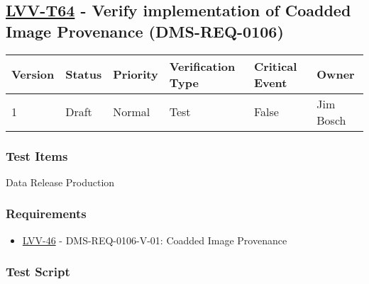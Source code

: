 \hypertarget{lvv-t64---verify-implementation-of-coadded-image-provenance-dms-req-0106}{%
\subsection{\texorpdfstring{\href{https://jira.lsstcorp.org/secure/Tests.jspa\#/testCase/LVV-T64}{LVV-T64}
- Verify implementation of Coadded Image Provenance
(DMS-REQ-0106)}{LVV-T64 - Verify implementation of Coadded Image Provenance (DMS-REQ-0106)}}\label{lvv-t64---verify-implementation-of-coadded-image-provenance-dms-req-0106}}

\begin{longtable}[]{@{}llllll@{}}
\toprule
Version & Status & Priority & Verification Type & Critical Event &
Owner\tabularnewline
\midrule
\endhead
1 & Draft & Normal & Test & False & Jim Bosch\tabularnewline
\bottomrule
\end{longtable}

\hypertarget{test-items-40}{%
\subsubsection{Test Items}\label{test-items-40}}

Data Release Production

\hypertarget{requirements-41}{%
\subsubsection{Requirements}\label{requirements-41}}

\begin{itemize}
\tightlist
\item
  \href{https://jira.lsstcorp.org/browse/LVV-46}{LVV-46} -
  DMS-REQ-0106-V-01: Coadded Image Provenance
\end{itemize}

\hypertarget{test-script-41}{%
\subsubsection{Test Script}\label{test-script-41}}

